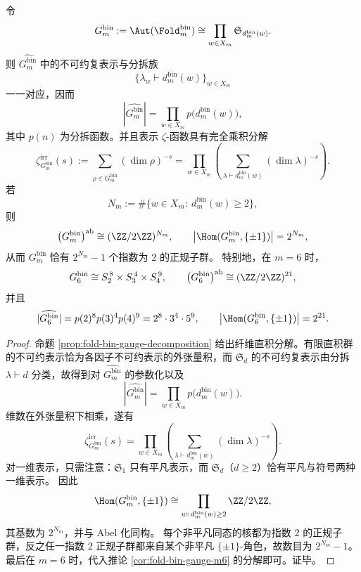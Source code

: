 \begin{theorem}[bin-fold 规范群的表示分配律与 \texorpdfstring{$m=6$}{m=6} 的精确谱]\label{thm:xi-foldbin-gauge-representation-distribution-law-m6-spectrum}
令
\[
G_m^{\mathrm{bin}}:=\Aut(\Fold^{\mathrm{bin}}_m)
\cong
\prod_{w\in X_m}\mathfrak S_{d_m^{\mathrm{bin}}(w)}.
\]
则 \(\widehat{G_m^{\mathrm{bin}}}\) 中的不可约复表示与分拆族
\[
\{\lambda_w\vdash d_m^{\mathrm{bin}}(w)\}_{w\in X_m}
\]
一一对应，因而
\[
|\widehat{G_m^{\mathrm{bin}}}|
=
\prod_{w\in X_m}p\!\bigl(d_m^{\mathrm{bin}}(w)\bigr),
\]
其中 \(p(n)\) 为分拆函数。并且表示 \(\zeta\)-函数具有完全乘积分解
\[
\zeta_{G_m^{\mathrm{bin}}}^{\mathrm{irr}}(s)
:=
\sum_{\rho\in\widehat{G_m^{\mathrm{bin}}}}(\dim\rho)^{-s}
=
\prod_{w\in X_m}
\left(
\sum_{\lambda\vdash d_m^{\mathrm{bin}}(w)}(\dim\lambda)^{-s}
\right).
\]
若
\[
N_m:=\#\{w\in X_m:\ d_m^{\mathrm{bin}}(w)\ge 2\},
\]
则
\[
\bigl(G_m^{\mathrm{bin}}\bigr)^{\mathrm{ab}}\cong (\ZZ/2\ZZ)^{N_m},
\qquad
\bigl|\Hom(G_m^{\mathrm{bin}},\{\pm 1\})\bigr|=2^{N_m},
\]
从而 \(G_m^{\mathrm{bin}}\) 恰有 \(2^{N_m}-1\) 个指数为 \(2\) 的正规子群。
特别地，在 \(m=6\) 时，
\[
G_6^{\mathrm{bin}}
\cong
S_2^{\,8}\times S_3^{\,4}\times S_4^{\,9},
\qquad
\bigl(G_6^{\mathrm{bin}}\bigr)^{\mathrm{ab}}\cong (\ZZ/2\ZZ)^{21},
\]
并且
\[
|\widehat{G_6^{\mathrm{bin}}}|
=
p(2)^8p(3)^4p(4)^9
=
2^8\cdot 3^4\cdot 5^9,
\qquad
\bigl|\Hom(G_6^{\mathrm{bin}},\{\pm 1\})\bigr|=2^{21}.
\]
\end{theorem}
\begin{proof}
命题 \ref{prop:fold-bin-gauge-decomposition} 给出纤维直积分解。有限直积群的不可约表示恰为各因子不可约表示的外张量积，而 \(\mathfrak S_d\) 的不可约复表示由分拆 \(\lambda\vdash d\) 分类，故得到对 \(\widehat{G_m^{\mathrm{bin}}}\) 的参数化以及
\[
|\widehat{G_m^{\mathrm{bin}}}|
=
\prod_{w\in X_m}p\!\bigl(d_m^{\mathrm{bin}}(w)\bigr).
\]
维数在外张量积下相乘，遂有
\[
\zeta_{G_m^{\mathrm{bin}}}^{\mathrm{irr}}(s)
=
\prod_{w\in X_m}
\left(
\sum_{\lambda\vdash d_m^{\mathrm{bin}}(w)}(\dim\lambda)^{-s}
\right).
\]
对一维表示，只需注意：\(\mathfrak S_1\) 只有平凡表示，而 \(\mathfrak S_d\)（\(d\ge 2\)）恰有平凡与符号两种一维表示。
因此
\[
\Hom(G_m^{\mathrm{bin}},\{\pm 1\})
\cong
\prod_{w:\,d_m^{\mathrm{bin}}(w)\ge 2}\ZZ/2\ZZ,
\]
其基数为 \(2^{N_m}\)，并与 Abel 化同构。
每个非平凡同态的核都为指数 \(2\) 的正规子群，反之任一指数 \(2\) 正规子群都来自某个非平凡 \(\{\pm1\}\)-角色，故数目为 \(2^{N_m}-1\)。
最后在 \(m=6\) 时，代入推论 \ref{cor:fold-bin-gauge-m6} 的分解即可。证毕。
\end{proof}

